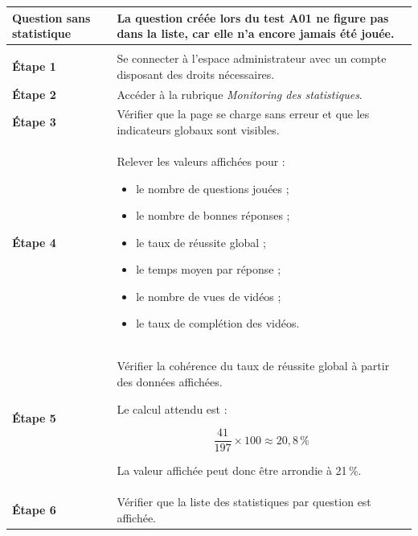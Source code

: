 \begin{longtable}{
    |>{\raggedright\arraybackslash}p{}
    |>{\raggedright\arraybackslash}p{}|
}
\textbf{Question sans statistique}
&
La question créée lors du test A01 ne figure pas dans la liste, car elle
n'a encore jamais été jouée.
\\
\hline


\rowcolor{orange!50}
\multicolumn{2}{|c|}{
    \textbf{Déroulement du test}
}
\\
\hline

\textbf{Étape 1}
&
Se connecter à l'espace administrateur avec un compte disposant des droits
nécessaires.
\\
\hline

\textbf{Étape 2}
&
Accéder à la rubrique \textit{Monitoring des statistiques}.
\\
\hline

\textbf{Étape 3}
&
Vérifier que la page se charge sans erreur et que les indicateurs globaux
sont visibles.
\\
\hline

\textbf{Étape 4}
&
Relever les valeurs affichées pour :
\begin{itemize}[leftmargin=*,nosep]
    \item le nombre de questions jouées ;
    \item le nombre de bonnes réponses ;
    \item le taux de réussite global ;
    \item le temps moyen par réponse ;
    \item le nombre de vues de vidéos ;
    \item le taux de complétion des vidéos.
\end{itemize}
\\
\hline

\textbf{Étape 5}
&
Vérifier la cohérence du taux de réussite global à partir des données
affichées.

Le calcul attendu est :

\[
\frac{41}{197} \times 100 \approx 20{,}8\,\%
\]

La valeur affichée peut donc être arrondie à 21\,\%.
\\
\hline

\textbf{Étape 6}
&
Vérifier que la liste des statistiques par question est affichée.
\\
\hline


\end{longtable}

